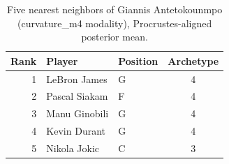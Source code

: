\begin{table}[htbp]
  \centering\small
  \begin{tabular}{rllc}
    \toprule
    Rank & Player & Position & Archetype \\
    \midrule
    1 & LeBron James & G & 4 \\
    2 & Pascal Siakam & F & 4 \\
    3 & Manu Ginobili & G & 4 \\
    4 & Kevin Durant & G & 4 \\
    5 & Nikola Jokic & C & 3 \\
    \bottomrule
  \end{tabular}
  \caption{Five nearest neighbors of Giannis Antetokounmpo (curvature_m4 modality), Procrustes-aligned posterior mean.}
  \label{tab:Giannis_Antetokounmpo_neighbors_curvature_m4}
\end{table}

